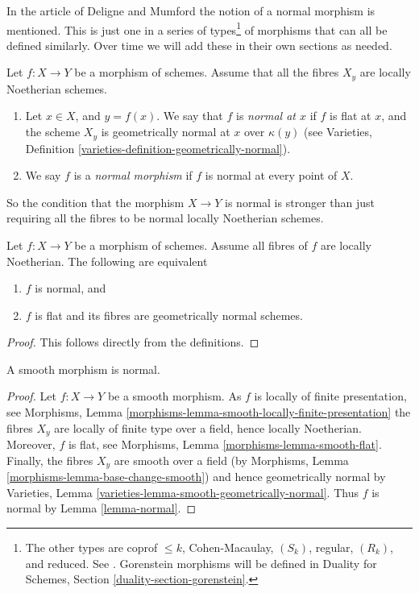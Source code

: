 \noindent
In the article \cite{DM} of Deligne and Mumford the notion of a normal
morphism is mentioned. This is just one in a series of types\footnote{
The other types are coprof $\leq k$, Cohen-Macaulay, $(S_k)$,
regular, $(R_k)$, and reduced. See \cite[IV Definition 6.8.1.]{EGA}.
Gorenstein morphisms will be defined in
Duality for Schemes, Section \ref{duality-section-gorenstein}.}
of morphisms that can all be defined similarly. Over time we will add
these in their own sections as needed.

\begin{definition}
\label{definition-normal}
Let $f : X \to Y$ be a morphism of schemes.
Assume that all the fibres $X_y$ are locally Noetherian schemes.
\begin{enumerate}
\item Let $x \in X$, and $y = f(x)$. We say that $f$ is {\it normal at $x$}
if $f$ is flat at $x$, and the scheme $X_y$ is geometrically
normal at $x$ over $\kappa(y)$ (see
Varieties, Definition \ref{varieties-definition-geometrically-normal}).
\item We say $f$ is a {\it normal morphism} if $f$ is normal
at every point of $X$.
\end{enumerate}
\end{definition}

\noindent
So the condition that the morphism $X \to Y$ is normal
is stronger than just requiring all
the fibres to be normal locally Noetherian schemes.

\begin{lemma}
\label{lemma-normal}
Let $f : X \to Y$ be a morphism of schemes.
Assume all fibres of $f$ are locally Noetherian.
The following are equivalent
\begin{enumerate}
\item $f$ is normal, and
\item $f$ is flat and its fibres are geometrically normal schemes.
\end{enumerate}
\end{lemma}

\begin{proof}
This follows directly from the definitions.
\end{proof}

\begin{lemma}
\label{lemma-smooth-normal}
A smooth morphism is normal.
\end{lemma}

\begin{proof}
Let $f : X \to Y$ be a smooth morphism.
As $f$ is locally of finite presentation, see
Morphisms, Lemma \ref{morphisms-lemma-smooth-locally-finite-presentation}
the fibres $X_y$ are locally of finite type over a field, hence
locally Noetherian. Moreover, $f$ is flat, see
Morphisms, Lemma \ref{morphisms-lemma-smooth-flat}.
Finally, the fibres $X_y$ are smooth over a field (by
Morphisms, Lemma \ref{morphisms-lemma-base-change-smooth})
and hence geometrically normal by
Varieties, Lemma \ref{varieties-lemma-smooth-geometrically-normal}.
Thus $f$ is normal by
Lemma \ref{lemma-normal}.
\end{proof}

